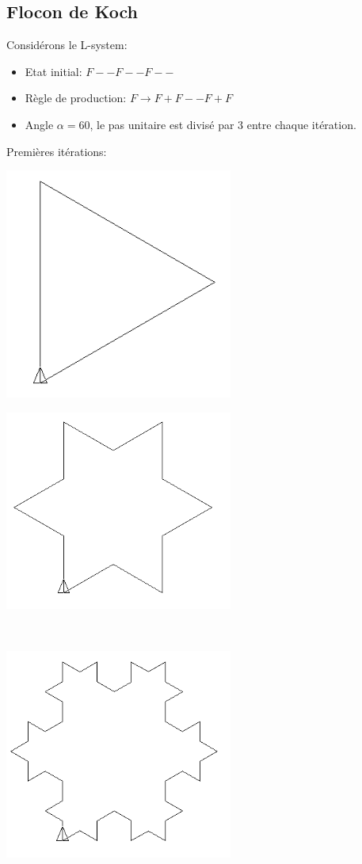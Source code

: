 \subsection{Flocon de Koch}
Considérons le L-system:
\begin{itemize}
 \item [\textbullet] Etat initial: $F--F--F--$
 \item [\textbullet] Règle de production: $F \rightarrow F+F--F+F$
 \item [\textbullet] Angle $\alpha=60$\degre, le pas unitaire est divisé par 3 entre chaque itération.
\end{itemize}
Premières itérations:
\begin{center}
\begin{minipage}{7.5cm}
 \includegraphics[width=7.5cm]{images/linden-flocon1.png}
\end{minipage}
\begin{minipage}{7.5cm}
 \includegraphics[width=7.5cm]{images/linden-flocon2.png}
\end{minipage}\\
\begin{minipage}{7.5cm}
 \includegraphics[width=7.5cm]{images/linden-flocon3.png}

\end{minipage}
\end{center}
